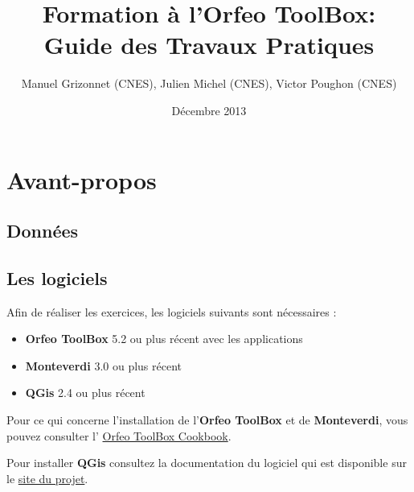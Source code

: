 \documentclass[a4paper,11pt,twoside,openright]{article}
\author{Manuel Grizonnet (CNES), Julien Michel (CNES), Victor Poughon (CNES)}
\date{Décembre 2013}
\title{Formation à l'Orfeo ToolBox: Guide des Travaux Pratiques}
\begin{document}
\maketitle
\tableofcontents

\pagestyle{fancy}
\fancyhf{}
\fancyhead[LE,RO]{\bfseries\thepage}
\fancyhead[LO]{\bfseries\rightmark}
\fancyhead[RE]{\bfseries\leftmark}

\section{Avant-propos}
\label{sec-1}
\subsection{Données}
\label{sec-1-1}

\subsection{Les logiciels}
\label{sec-1-2}

Afin de réaliser les exercices, les logiciels suivants sont
nécessaires :

\begin{itemize}
\item \textbf{Orfeo ToolBox} 5.2 ou plus récent avec les applications
\item \textbf{Monteverdi} 3.0 ou plus récent
\item \textbf{QGis} 2.4 ou plus récent
\end{itemize}

Pour ce qui concerne l'installation de l'\textbf{Orfeo ToolBox} et
de  \textbf{Monteverdi}, vous pouvez consulter l' \href{http://www.orfeo-toolbox.org/packages/OTBSoftwareGuide.pdf}{Orfeo ToolBox Cookbook}.

Pour installer \textbf{QGis} consultez la documentation du logiciel qui est
disponible sur le  \href{http://www.qgis.org/}{site du projet}.
\end{document}

